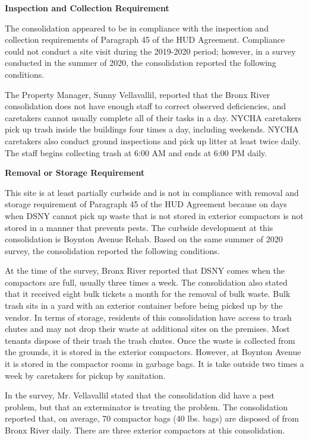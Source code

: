  

\textbf{Inspection and Collection Requirement} 

 

The consolidation appeared to be in compliance with the inspection and collection requirements of Paragraph 45 of the HUD Agreement. Compliance could not conduct a site visit during the 2019-2020 period; however, in a survey conducted in the summer of 2020, the consolidation reported the following conditions.

The Property Manager, Sunny Vellavallil, reported that the Bronx River consolidation does not have enough staff to correct observed deficiencies, and caretakers cannot usually complete all of their tasks in a day. NYCHA caretakers pick up trash inside the buildings four times a day, including weekends. NYCHA caretakers also conduct ground inspections and pick up litter at least twice daily. The staff begins collecting trash at 6:00 AM and ends at 6:00 PM daily. 

\textbf{Removal or Storage Requirement} 

This site is at least partially curbside and is not in compliance with removal and storage requirement of Paragraph 45 of the HUD Agreement because on days when DSNY cannot pick up waste that is not stored in exterior compactors is not stored in a manner that prevents pests. The curbside development at this consolidation is Boynton Avenue Rehab. Based on the same summer of  2020 survey, the consolidation reported the following conditions.

At the time of the survey, Bronx River reported that DSNY comes when the compactors are full, usually three times a week. The consolidation also stated that it received eight bulk tickets a month for the removal of bulk waste.  Bulk trash sits in a yard with an exterior container before being picked up by the vendor.  In terms of storage, residents of this consolidation have access to trash chutes and may not drop their waste at additional sites on the premises. Most tenants dispose of their trash the trash chutes. Once the waste is collected from the grounds, it is stored in the exterior compactors. However, at Boynton Avenue it is stored in the compactor rooms in garbage bags. It is take outside two times a week by caretakers for pickup by sanitation.

 

In the survey, Mr. Vellavallil stated that the consolidation did have a pest problem, but that an exterminator is treating the problem. The consolidation reported that, on average, 70 compactor bags (40 lbs. bags)  are disposed of from Bronx River daily. There are three exterior compactors at this consolidation. 

